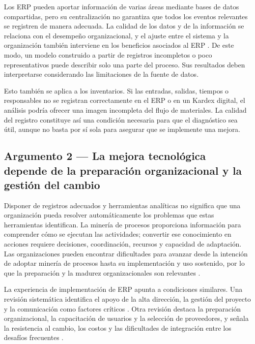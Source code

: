 \documentclass{article}
\begin{document}
    Los ERP pueden aportar información de varias áreas mediante bases de datos compartidas, pero su centralización no garantiza que todos los eventos relevantes se registren de manera adecuada. La calidad de los datos y de la información se relaciona con el desempeño organizacional, y el ajuste entre el sistema y la organización también interviene en los beneficios asociados al ERP \cite{erpimpact2024}. De este modo, un modelo construido a partir de registros incompletos o poco representativos puede describir solo una parte del proceso. Sus resultados deben interpretarse considerando las limitaciones de la fuente de datos.

    Esto también se aplica a los inventarios. Si las entradas, salidas, tiempos o responsables no se registran correctamente en el ERP o en un Kardex digital, el análisis podría ofrecer una imagen incompleta del flujo de materiales. La calidad del registro constituye así una condición necesaria para que el diagnóstico sea útil, aunque no basta por sí sola para asegurar que se implemente una mejora.

    \subsection{Argumento 2 — La mejora tecnológica depende de la preparación organizacional y la gestión del cambio}

    Disponer de registros adecuados y herramientas analíticas no significa que una organización pueda resolver automáticamente los problemas que estas herramientas identifican. La minería de procesos proporciona información para comprender cómo se ejecutan las actividades; convertir ese conocimiento en acciones requiere decisiones, coordinación, recursos y capacidad de adaptación. Las organizaciones pueden encontrar dificultades para avanzar desde la intención de adoptar minería de procesos hasta su implementación y uso sostenido, por lo que la preparación y la madurez organizacionales son relevantes \cite{processminingmaturity2024}.

    La experiencia de implementación de ERP apunta a condiciones similares. Una revisión sistemática identifica el apoyo de la alta dirección, la gestión del proyecto y la comunicación como factores críticos \cite{alimiller2017erp}. Otra revisión destaca la preparación organizacional, la capacitación de usuarios y la selección de proveedores, y señala la resistencia al cambio, los costos y las dificultades de integración entre los desafíos frecuentes \cite{talo2025erp}.
\end{document}
